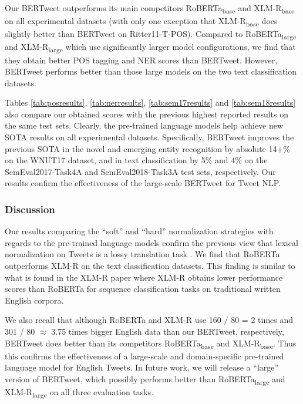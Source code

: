 \documentclass[11pt,a4paper]{article}
\begin{document}
Our BERTweet outperforms its main competitors RoBERTa\textsubscript{base}  and XLM-R\textsubscript{base} on all experimental datasets (with only one exception that XLM-R\textsubscript{base} does slightly better than BERTweet on Ritter11-T-POS). Compared to  RoBERTa\textsubscript{large}  and XLM-R\textsubscript{large} which use significantly larger model configurations, we find that they obtain better POS tagging and NER scores than BERTweet. However, BERTweet performs better than those large models on the two text classification datasets.

Tables \ref{tab:posresults}, \ref{tab:nerresults}, \ref{tab:sem17results} and \ref{tab:sem18results}  also compare our obtained scores with the previous highest reported results on the same test sets. Clearly, the pre-trained language models help achieve new SOTA results on all experimental datasets. Specifically, BERTweet improves the previous SOTA in the novel and emerging entity recognition by absolute 14+\% on the WNUT17 dataset, and in text classification  by 5\% and 4\%  on the SemEval2017-Task4A  and SemEval2018-Task3A  test sets, respectively. 
Our results confirm the effectiveness of the large-scale BERTweet for Tweet NLP.

\subsubsection*{Discussion}

Our results comparing the ``soft'' and ``hard'' normalization strategies with regards to the pre-trained language models confirm the previous view that lexical normalization on Tweets is a lossy translation task \cite{owoputi-etal-2013-improved}. 
We find that RoBERTa outperforms XLM-R on the text classification datasets. This finding is similar to what is found in the XLM-R paper \citep{conneau2019unsupervised} where XLM-R obtains lower performance scores than RoBERTa for sequence classification tasks on traditional written English corpora.
 
We also recall that although RoBERTa and XLM-R use 160 / 80 = 2 times and 301 / 80 $\approx$ 3.75 times bigger English data than our BERTweet, respectively, BERTweet does better than its competitors RoBERTa\textsubscript{base} and XLM-R\textsubscript{base}. Thus this confirms the effectiveness of a large-scale and domain-specific pre-trained language model for English Tweets. In future work, we will release a ``large'' version of BERTweet, which possibly performs better than RoBERTa\textsubscript{large} and XLM-R\textsubscript{large} on all three evaluation tasks. 
\end{document}
